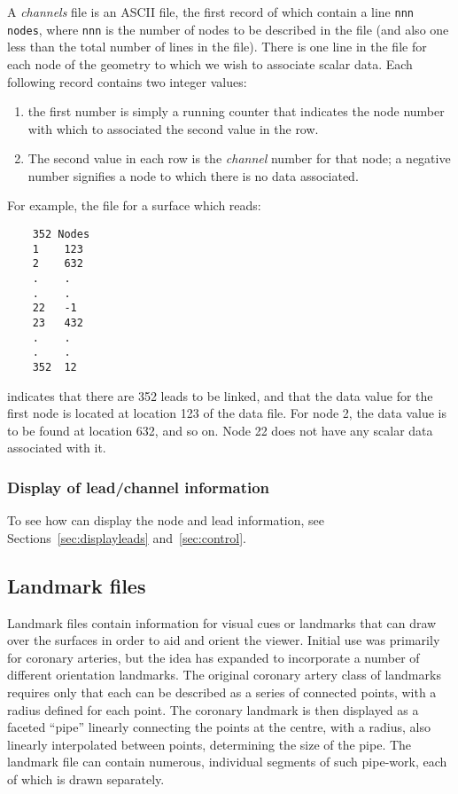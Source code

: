 A \emph{channels} file is an ASCII file, the first record of which contain a
line {\tt nnn nodes}, where {\tt nnn} is the number of nodes to be
described in the file (and also one less than the total number of lines in
the file).  There is one line in the file for each node of the geometry to
which we wish to associate scalar data.   Each following record contains
two integer values:\\ 
%
\begin{enumerate}
  \item the first number is simply a running counter that indicates
        the node number with which to associated the second value in the
        row.
  \item The second value in each row is the {\em channel\/} number for
        that node; a negative number signifies a node to which there is no
        data associated.
\end{enumerate}
%
For example, the file for a surface which reads:\\
%
\begin{verbatim}
    352 Nodes
    1    123
    2    632
    .    .
    .    .
    22   -1
    23   432
    .    .
    .    .
    352  12
\end{verbatim}
%
indicates that there are 352 leads to be linked, and that the data value
for the first node is located at location 123 of the data file.  For node
2, the data value is to be found at location 632, and so on.  Node 22 does
not have any scalar data associated with it.

\subsubsection{Display of lead/channel information}

To see how \map{} can display the node and lead information, see
Sections~\ref{sec:displayleads} and~\ref{sec:control}. 


  \subsection{Landmark files}
  \label{sec:lmfile} 

  Landmark files contain information for visual cues or landmarks that \map{}
  can draw over the surfaces in order to aid and orient the viewer. Initial
  use was primarily for coronary arteries, but the idea has expanded to
  incorporate a number of different orientation landmarks.  The original
  coronary artery class of landmarks requires only that each can be described
  as a series of connected points, with a radius defined for each point.  The
  coronary landmark is then displayed as a faceted ``pipe'' linearly
  connecting the points at the centre, with a radius, also linearly
  interpolated between points, determining the size of the pipe.  The
  landmark file can contain numerous, individual segments of such pipe-work,
  each of which is drawn separately.

